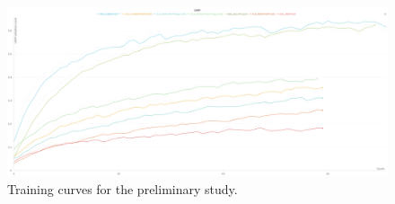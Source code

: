 \begin{figure}[ht]
    \centering
    \includegraphics[width=1.\textwidth]{figures/preliminary_study.png}
    \caption{Training curves for the preliminary study.}
    \label{fig:preliminary_study_curves}
\end{figure}

